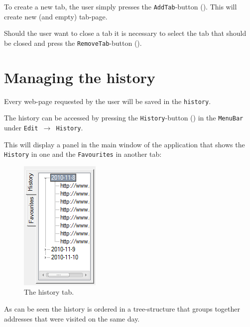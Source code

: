 To create a new tab, the user simply presses the \texttt{AddTab}-button (). This will create new (and empty) tab-page.

Should the user want to close a tab it is necessary to select the tab that should be closed and press the \texttt{RemoveTab}-button ().

\section{Managing the history}
\label{sec:managing_history}

Every web-page requested by the user will be saved in the \texttt{history}.

The history can be accessed by pressing the \texttt{History}-button () in the \texttt{MenuBar} under \texttt{Edit $\rightarrow$ History}.

This will display a panel in the main window of the application that shows the \texttt{History} in one and the \texttt{Favourites} in another tab:

\begin{figure}[H]
\begin{center}
\includegraphics[scale=1]{gfx/history.png}
\caption{The history tab.}
\label{fig:history_tab}
\end{center}
\end{figure}

As can be seen the history is ordered in a tree-structure that groups together addresses that were visited on the same day.

